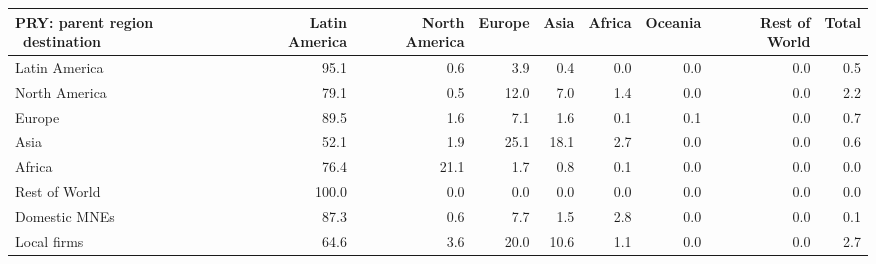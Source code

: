 \begin{tabular}{lrrrrrrrr}
\toprule
PRY: parent region \ destination & Latin America & North America & Europe & Asia & Africa & Oceania & Rest of World & Total \\
\midrule
Latin America & 95.1 & 0.6 & 3.9 & 0.4 & 0.0 & 0.0 & 0.0 & 0.5 \\
North America & 79.1 & 0.5 & 12.0 & 7.0 & 1.4 & 0.0 & 0.0 & 2.2 \\
Europe & 89.5 & 1.6 & 7.1 & 1.6 & 0.1 & 0.1 & 0.0 & 0.7 \\
Asia & 52.1 & 1.9 & 25.1 & 18.1 & 2.7 & 0.0 & 0.0 & 0.6 \\
Africa & 76.4 & 21.1 & 1.7 & 0.8 & 0.1 & 0.0 & 0.0 & 0.0 \\
Rest of World & 100.0 & 0.0 & 0.0 & 0.0 & 0.0 & 0.0 & 0.0 & 0.0 \\
Domestic MNEs & 87.3 & 0.6 & 7.7 & 1.5 & 2.8 & 0.0 & 0.0 & 0.1 \\
Local firms & 64.6 & 3.6 & 20.0 & 10.6 & 1.1 & 0.0 & 0.0 & 2.7 \\
\bottomrule
\end{tabular}
